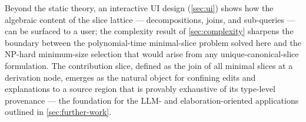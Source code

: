 Beyond the static theory, an interactive UI design (\cref{sec:ui}) shows how the algebraic content of the slice lattice --- decompositions, joins, and sub-queries --- can be surfaced to a user; the complexity result of \cref{sec:complexity} sharpens the boundary between the polynomial-time minimal-slice problem solved here and the NP-hard minimum-size selection that would arise from any unique-canonical-slice formulation. The contribution slice, defined as the join of all minimal slices at a derivation node, emerges as the natural object for confining edits and explanations to a source region that is provably exhaustive of its type-level provenance --- the foundation for the LLM- and elaboration-oriented applications outlined in \cref{sec:further-work}.

